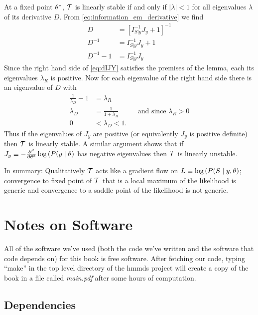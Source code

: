 At a fixed point ${\theta^*}$, $\EMmap$ is linearly stable if and
only if $\left| \lambda \right| < 1$ for all eigenvalues $\lambda$ of
its derivative $D$.  From \eqref{eq:information_em_derivative} we find
\begin{align}
  \nonumber
  D &= \left[I_{S|y}^{-1} J_y + 1 \right]^{-1} \\
  \nonumber
  D^{-1} &= I_{S|y}^{-1} J_y + 1 \\
  \label{eq:dIJY}
  D^{-1} -1  &= I_{S|y}^{-1} J_y
\end{align}
Since the right hand side of \eqref{eq:dIJY} satisfies the premises of
the lemma, each its eigenvalues $\lambda_R$ is positive.  Now for each
eigenvalue of the right hand side there is an eigenvalue of $D$ with
\begin{align}
  \nonumber
  \frac{1}{\lambda_D} - 1 &= \lambda_R  \\
  \nonumber
  \lambda_D &= \frac{1}{1+\lambda_R} &&\text{and since } \lambda_R >0 \\
  \label{eq:D_is_stable}
  0 &< \lambda_D < 1.
\end{align}
Thus if the eigenvalues of $J_y$ are positive (or equivalently $J_y$
is positive definite) then $\EMmap$ is linearly stable.  A similar
argument shows that if
$J_y\equiv-\frac{\partial^2}{\partial \theta^2} \log \left( P(y \mid
  \theta \right)$ has negative eigenvalues then $\EMmap$ is linearly
unstable.

In summary: Qualitatively $\EMmap$ acts like a gradient flow on
$L\equiv\log \left( P(S \mid y, \theta \right)$;  convergence to
fixed point of $\EMmap$ that is a local maximum of the likelihood is
generic and convergence to a saddle point of the likelihood is not
generic.

\chapter{Notes on Software}
\label{cha:Software}

All of the software we've used (both the code we've written and the
software that code depends on) for this book is free software.  After
fetching our code, typing ``make'' in the top level directory of the
hmmds project will create a copy of the book in a file called
\emph{main.pdf} after some hours of computation.

\section{Dependencies}
\label{sec:SWdep}

